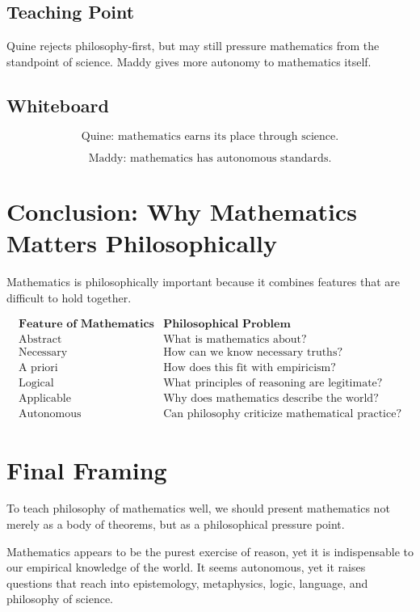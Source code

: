 \documentclass[11pt]{article}
\begin{document}
\subsection*{Teaching Point}

Quine rejects philosophy-first, but may still pressure mathematics from the standpoint of
science. Maddy gives more autonomy to mathematics itself.

\subsection*{Whiteboard}

\[
\text{Quine: mathematics earns its place through science.}
\]

\[
\text{Maddy: mathematics has autonomous standards.}
\]

\section*{Conclusion: Why Mathematics Matters Philosophically}

Mathematics is philosophically important because it combines features that are difficult to
hold together.

\[
\begin{array}{c|c}
\textbf{Feature of Mathematics} & \textbf{Philosophical Problem} \\
\hline
\text{Abstract} & \text{What is mathematics about?} \\
\text{Necessary} & \text{How can we know necessary truths?} \\
\text{A priori} & \text{How does this fit with empiricism?} \\
\text{Logical} & \text{What principles of reasoning are legitimate?} \\
\text{Applicable} & \text{Why does mathematics describe the world?} \\
\text{Autonomous} & \text{Can philosophy criticize mathematical practice?}
\end{array}
\]

\section*{Final Framing}

To teach philosophy of mathematics well, we should present mathematics not merely as a
body of theorems, but as a philosophical pressure point.

Mathematics appears to be the purest exercise of reason, yet it is indispensable to our
empirical knowledge of the world. It seems autonomous, yet it raises questions that reach
into epistemology, metaphysics, logic, language, and philosophy of science.
\end{document}
